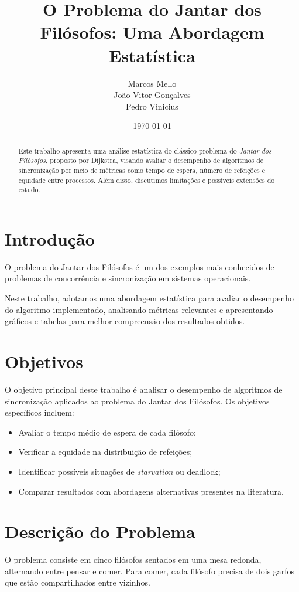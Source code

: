 \documentclass[12pt,a4paper]{article}
\title{O Problema do Jantar dos Filósofos: Uma Abordagem Estatística}
\author{
\begin{tabular}{l}
Marcos Mello \\
João Vitor Gonçalves \\
Pedro Vinicius
\end{tabular}
}
\date{\today}
\begin{document}
\maketitle

\begin{abstract}
Este trabalho apresenta uma análise estatística do clássico problema do \textit{Jantar dos Filósofos}, proposto por Dijkstra, visando avaliar o desempenho de algoritmos de sincronização por meio de métricas como tempo de espera, número de refeições e equidade entre processos. Além disso, discutimos limitações e possíveis extensões do estudo.
\end{abstract}

\section{Introdução}
O problema do Jantar dos Filósofos é um dos exemplos mais conhecidos de problemas de concorrência e sincronização em sistemas operacionais.  

Neste trabalho, adotamos uma abordagem estatística para avaliar o desempenho do algoritmo implementado, analisando métricas relevantes e apresentando gráficos e tabelas para melhor compreensão dos resultados obtidos.

\section{Objetivos}
O objetivo principal deste trabalho é analisar o desempenho de algoritmos de sincronização aplicados ao problema do Jantar dos Filósofos.  
Os objetivos específicos incluem:

\begin{itemize}
    \item Avaliar o tempo médio de espera de cada filósofo;
    \item Verificar a equidade na distribuição de refeições;
    \item Identificar possíveis situações de \textit{starvation} ou deadlock;
    \item Comparar resultados com abordagens alternativas presentes na literatura.
\end{itemize}

\section{Descrição do Problema}
O problema consiste em cinco filósofos sentados em uma mesa redonda, alternando entre pensar e comer. Para comer, cada filósofo precisa de dois garfos que estão compartilhados entre vizinhos.  
\end{document}
